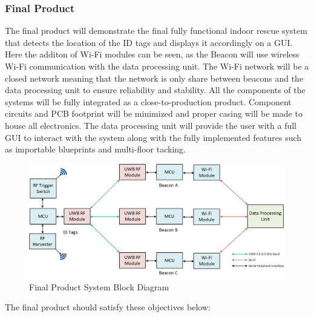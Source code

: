 \subsubsection{Final Product}
\medskip
The final product will demonstrate the final fully functional indoor rescue system that detects the location of the ID tags and displays it accordingly on a GUI. Here the additon of Wi-Fi modules can be seen, as the Beacon will use wireless Wi-Fi communication with the data processing unit. The Wi-Fi network will be a closed network meaning that the network is only share between beacons and the data processing unit to ensure reliability and stability. All the components of the systems will be fully integrated as a close-to-production product. Component circuits and \Gls{PCB} footprint will be minimized and proper casing will be made to house all electronics. The data processing unit will provide the user with a full GUI to interact with the system along with the fully implemented features such as importable blueprints and multi-floor tacking.
\medskip
\begin{figure}[h!]
    \centering
    \includegraphics[width=\linewidth]{./images/03_sys_Final.png}
    \caption{Final Product System Block Diagram}
    \label{final_prod_sys_blk}
\end{figure}
\bigskip

The final product should satisfy these objectives below:


